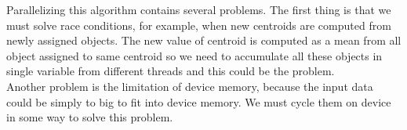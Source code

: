 Parallelizing this algorithm contains several problems. The first thing is that we must solve race conditions, for example, when new centroids are computed from newly assigned objects. The new value of centroid is computed as a mean from all object assigned to same centroid so we need to accumulate all these objects in single variable from different threads and this could be the problem.\\
Another problem is the limitation of device memory, because the input data could be simply to big to fit into device memory. We must cycle them on device in some way to solve this problem.
\\



